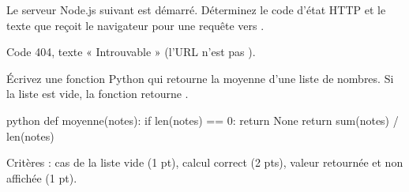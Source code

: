 \begin{question}[points=2, lines=4]
  Le serveur Node.js suivant est démarré.
  Déterminez le code d'état HTTP et le texte que reçoit le navigateur
  pour une requête vers .
  \begin{solution}
    Code 404, texte « Introuvable » (l'URL n'est pas \codeinline{/}).
  \end{solution}
\end{question}

\begin{question}[points=4, box=7cm]
  Écrivez une fonction Python  qui retourne la
  moyenne d'une liste de nombres. Si la liste est vide, la fonction
  retourne .
  \begin{solution}
\begin{code}[numbers=none]{python}
def moyenne(notes):
    if len(notes) == 0:
        return None
    return sum(notes) / len(notes)
\end{code}
    Critères : cas de la liste vide (1 pt), calcul correct (2 pts),
    valeur retournée et non affichée (1 pt).
  \end{solution}
\end{question}
